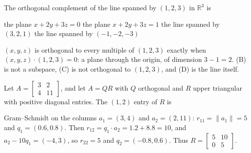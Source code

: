 \begin{question}[id=orth-19]
The orthogonal complement of the line spanned by $(1, 2, 3)$ in $\mathbb{R}^3$ is
\begin{options}
  \correct the plane $x + 2y + 3z = 0$
  \option the plane $x + 2y + 3z = 1$
  \option the line spanned by $(3, 2, 1)$
  \option the line spanned by $(-1, -2, -3)$
\end{options}
\begin{solution}
$(x, y, z)$ is orthogonal to every multiple of $(1, 2, 3)$ exactly when $(x, y, z) \cdot (1, 2, 3) = 0$: a plane through the origin, of dimension $3 - 1 = 2$. (B) is not a subspace, (C) is not orthogonal to $(1, 2, 3)$, and (D) is the line itself.
\end{solution}
\end{question}

\begin{question}[id=orth-20, marks=2]
Let $A = \begin{bmatrix} 3 & 2 \\ 4 & 11 \end{bmatrix}$, and let $A = QR$ with $Q$ orthogonal and $R$ upper triangular with positive diagonal entries. The $(1, 2)$ entry of $R$ is
\begin{solution}
Gram--Schmidt on the columns $a_1 = (3, 4)$ and $a_2 = (2, 11)$: $r_{11} = \|a_1\| = 5$ and $q_1 = (0.6, 0.8)$. Then $r_{12} = q_1 \cdot a_2 = 1.2 + 8.8 = 10$, and $a_2 - 10q_1 = (-4, 3)$, so $r_{22} = 5$ and $q_2 = (-0.8, 0.6)$. Thus $R = \begin{bmatrix} 5 & 10 \\ 0 & 5 \end{bmatrix}$.
\end{solution}
\end{question}


